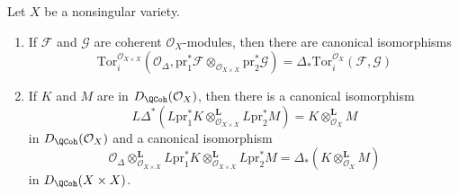 \begin{lemma}
\label{lemma-tor-and-diagonal}
Let $X$ be a nonsingular variety.
\begin{enumerate}
\item If $\mathcal{F}$ and $\mathcal{G}$ are coherent $\mathcal{O}_X$-modules,
then there are canonical isomorphisms
$$
\text{Tor}_i^{\mathcal{O}_{X \times X}}(\mathcal{O}_\Delta,
\text{pr}_1^*\mathcal{F} \otimes_{\mathcal{O}_{X \times X}}
\text{pr}_2^*\mathcal{G})
=
\Delta_*\text{Tor}_i^{\mathcal{O}_X}(\mathcal{F}, \mathcal{G})
$$
\item If $K$ and $M$ are in $D_\QCoh(\mathcal{O}_X)$, then
there is a canonical isomorphism
$$
L\Delta^* \left(
L\text{pr}_1^*K \otimes_{\mathcal{O}_{X \times X}}^\mathbf{L} L\text{pr}_2^*M
\right)
= K \otimes_{\mathcal{O}_X}^\mathbf{L} M
$$
in $D_\QCoh(\mathcal{O}_X)$ and a canonical isomorphism
$$
\mathcal{O}_\Delta \otimes_{\mathcal{O}_{X \times X}}^\mathbf{L}
L\text{pr}_1^*K \otimes_{\mathcal{O}_{X \times X}}^\mathbf{L} L\text{pr}_2^*M
= \Delta_*(K \otimes_{\mathcal{O}_X}^\mathbf{L} M)
$$
in $D_\QCoh(X \times X)$.
\end{enumerate}
\end{lemma}

